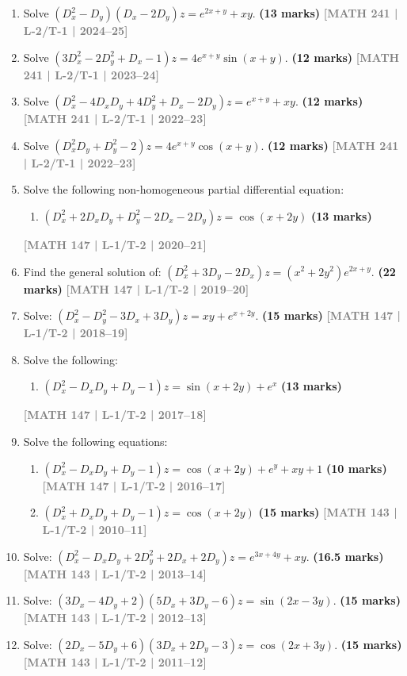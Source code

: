 \documentclass[12pt]{article}
\newcommand{\yr}[1]{\hfill\textcolor{gray}{\small\textbf{[#1]}}}
\newcommand{\mk}[1]{\textcolor{orange!70!black}{\small\textbf{(#1 marks)}}}
\begin{document}
\begin{enumerate}


\item Solve $(D_{x}^{2}-D_{y})(D_{x}-2D_{y})z=e^{2x+y}+xy$.
\mk{13} \yr{MATH 241 | L-2/T-1 | 2024--25}

\item Solve $(3D_{x}^{2}-2D_{y}^{2}+D_{x}-1)z=4e^{x+y}\sin(x+y)$.
\mk{12} \yr{MATH 241 | L-2/T-1 | 2023--24}

\item Solve $(D_{x}^{2}-4D_{x}D_{y}+4D_{y}^{2}+D_{x}-2D_{y})z=e^{x+y}+xy$.
\mk{12} \yr{MATH 241 | L-2/T-1 | 2022--23}

\item Solve $(D_{x}^{2}D_{y}+D_{y}^{2}-2)z=4e^{x+y}\cos(x+y)$.
\mk{12} \yr{MATH 241 | L-2/T-1 | 2022--23}

\item Solve the following non-homogeneous partial differential equation:
\begin{enumerate}
  \item $(D_{x}^{2}+2D_{x}D_{y}+D_{y}^{2}-2D_{x}-2D_{y})z=\cos(x+2y)$ \mk{13}
\end{enumerate}
\yr{MATH 147 | L-1/T-2 | 2020--21}

\item Find the general solution of: $(D_{x}^{2}+3D_{y}-2D_{x})z=(x^{2}+2y^{2})e^{2x+y}$.
\mk{22} \yr{MATH 147 | L-1/T-2 | 2019--20}

\item Solve: $(D_{x}^{2}-D_{y}^{2}-3D_{x}+3D_{y})z=xy+e^{x+2y}$.
\mk{15} \yr{MATH 147 | L-1/T-2 | 2018--19}

\item Solve the following:
\begin{enumerate}
  \item $(D_{x}^{2}-D_{x}D_{y}+D_{y}-1)z=\sin(x+2y)+e^{x}$ \mk{13}
\end{enumerate}
\yr{MATH 147 | L-1/T-2 | 2017--18}

\item Solve the following equations:
\begin{enumerate}
  \item $(D_{x}^{2}-D_{x}D_{y}+D_{y}-1)z=\cos(x+2y)+e^{y}+xy+1$ \mk{10} \yr{MATH 147 | L-1/T-2 | 2016--17}
  \item $(D_{x}^{2}+D_{x}D_{y}+D_{y}-1)z=\cos(x+2y)$ \mk{15} \yr{MATH 143 | L-1/T-2 | 2010--11}
\end{enumerate}

\item Solve: $(D_{x}^{2}-D_{x}D_{y}+2D_{y}^{2}+2D_{x}+2D_{y})z=e^{3x+4y}+xy$.
\mk{16.5} \yr{MATH 143 | L-1/T-2 | 2013--14}

\item Solve: $(3D_{x}-4D_{y}+2)(5D_{x}+3D_{y}-6)z=\sin(2x-3y)$.
\mk{15} \yr{MATH 143 | L-1/T-2 | 2012--13}

\item Solve: $(2D_{x}-5D_{y}+6)(3D_{x}+2D_{y}-3)z=\cos(2x+3y)$.
\mk{15} \yr{MATH 143 | L-1/T-2 | 2011--12}

\end{enumerate}
\end{document}
